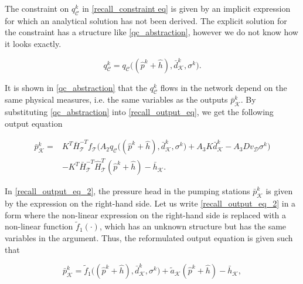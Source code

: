 
The constraint on $q^{k}_{\mathcal{C}}$ in \eqref{recall_constraint eq} is given by an implicit expression for which an analytical solution has not been derived. The explicit solution for the constraint has a structure like \eqref{qc_abstraction}, however we do not know how it looks exactly.

 \begin{equation}
\label{qc_abstraction}
q^{k}_{\mathcal{C}} = q_{\mathcal{C}} \big( (\hat{p}^{k} + \hat{h}),\bar{d}^{k}_{\mathcal{K}}, \sigma^{k} \big).
\end{equation} 

It is shown in \eqref{qc_abstraction} that the $q^{k}_{\mathcal{C}}$ flows in the network depend on the same physical measures, i.e. the same variables as the outputs $\bar{p}^{k}_{\mathcal{K}}$. By substituting \eqref{qc_abstraction} into \eqref{recall_output_eq}, we get the following output equation

\vspace{-4mm}
\begin{align}
  \label{recall_output_eq_2}
      \bar{p}^{k}_{\mathcal{K}}  = & \nonumber K^T \bar{H}^{-T}_{\mathcal{T}}f_{\mathcal{T}} \big (A_2 q_{\mathcal{C}}\big ((\hat{p}^{k} + \hat{h}),\bar{d}^{k}_{\mathcal{K}}, \sigma^{k} \big) + A_3 K \bar{d}^{k}_{\mathcal{K}} - A_3 D v_{\mathcal{D}} \sigma^{k} \big)   \\ &  - K^T\bar{H}^{-T}_{\mathcal{T}}\hat{H}^{T}_{\mathcal{T}} (\hat{p}^{k} + \hat{h}) - \bar{h}_{\mathcal{K}} .
\end{align}

\vspace{-4mm}
In \eqref{recall_output_eq_2}, the pressure head in the pumping stations $\bar{p}^{k}_{\mathcal{K}}$ is given by the expression on the right-hand side. Let us write \eqref{recall_output_eq_2} in a form where the non-linear expression on the right-hand side is replaced with a non-linear function $\tilde{f}_1(\cdot)$, which has an unknown structure but has the same variables in the argument. Thus, the reformulated output equation is given such that 

 \begin{equation}
  \label{recall_output_eq_3}
     \bar{p}^{k}_{\mathcal{K}}  = \tilde{f}_1 \big((\hat{p}^{k} + \hat{h}),\bar{d}^{k}_{\mathcal{K}}, \sigma^{k}\big) + \tilde{a}_{\mathcal{K}} (\hat{p}^{k} + \hat{h}) - \bar{h}_{\mathcal{K}}, 
\end{equation} 

